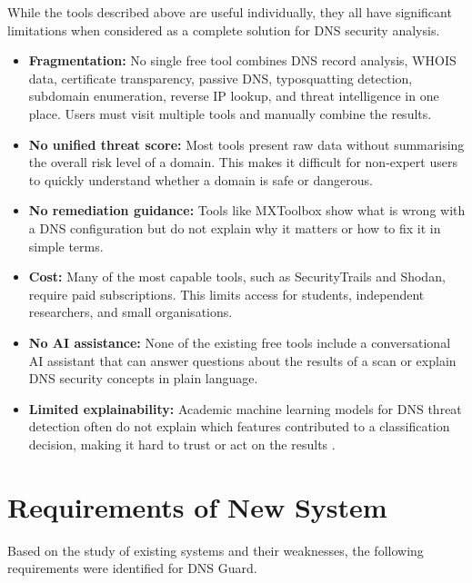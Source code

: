 \documentclass[12pt, a4paper, oneside]{report}
\begin{document}
While the tools described above are useful individually, they all have significant limitations when considered as a complete solution for DNS security analysis.

\begin{itemize}
    \item \textbf{Fragmentation:} No single free tool combines DNS record analysis, WHOIS data, certificate transparency, passive DNS, typosquatting detection, subdomain enumeration, reverse IP lookup, and threat intelligence in one place. Users must visit multiple tools and manually combine the results.
    \item \textbf{No unified threat score:} Most tools present raw data without summarising the overall risk level of a domain. This makes it difficult for non-expert users to quickly understand whether a domain is safe or dangerous.
    \item \textbf{No remediation guidance:} Tools like MXToolbox show what is wrong with a DNS configuration but do not explain why it matters or how to fix it in simple terms.
    \item \textbf{Cost:} Many of the most capable tools, such as SecurityTrails and Shodan, require paid subscriptions. This limits access for students, independent researchers, and small organisations.
    \item \textbf{No AI assistance:} None of the existing free tools include a conversational AI assistant that can answer questions about the results of a scan or explain DNS security concepts in plain language.
    \item \textbf{Limited explainability:} Academic machine learning models for DNS threat detection often do not explain which features contributed to a classification decision, making it hard to trust or act on the results \cite{lipton2018interpretability}.
\end{itemize}

\section{Requirements of New System}

Based on the study of existing systems and their weaknesses, the following requirements were identified for DNS Guard.
\end{document}
